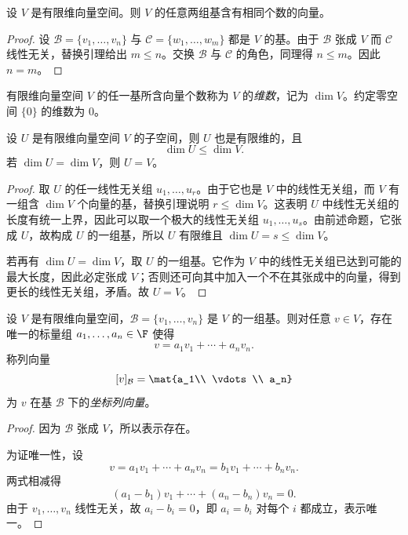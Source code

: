\begin{theorem}[维数的良定义]
设 $V$ 是有限维向量空间。则 $V$ 的任意两组基含有相同个数的向量。
\end{theorem}

\begin{proof}
设 $\mathcal B=\{v_1,\dots,v_n\}$ 与 $\mathcal C=\{w_1,\dots,w_m\}$ 都是 $V$ 的基。由于 $\mathcal B$ 张成 $V$ 而 $\mathcal C$ 线性无关，替换引理给出 $m\le n$。交换 $\mathcal B$ 与 $\mathcal C$ 的角色，同理得 $n\le m$。因此 $n=m$。
\end{proof}

\begin{definition}
有限维向量空间 $V$ 的任一基所含向量个数称为 $V$ 的\emph{维数}，记为 $\dim V$。约定零空间 $\{0\}$ 的维数为 $0$。
\end{definition}

\begin{proposition}
设 $U$ 是有限维向量空间 $V$ 的子空间，则 $U$ 也是有限维的，且
\[
\dim U\le \dim V.
\]
若 $\dim U=\dim V$，则 $U=V$。
\end{proposition}

\begin{proof}
取 $U$ 的任一线性无关组 $u_1,\dots,u_r$。由于它也是 $V$ 中的线性无关组，而 $V$ 有一组含 $\dim V$ 个向量的基，替换引理说明 $r\le \dim V$。这表明 $U$ 中线性无关组的长度有统一上界，因此可以取一个极大的线性无关组 $u_1,\dots,u_s$。由前述命题，它张成 $U$，故构成 $U$ 的一组基，所以 $U$ 有限维且 $\dim U=s\le \dim V$。

若再有 $\dim U=\dim V$，取 $U$ 的一组基。它作为 $V$ 中的线性无关组已达到可能的最大长度，因此必定张成 $V$；否则还可向其中加入一个不在其张成中的向量，得到更长的线性无关组，矛盾。故 $U=V$。
\end{proof}

\begin{proposition}[坐标的存在唯一性]
设 $V$ 是有限维向量空间，$\mathcal B=\{v_1,\dots,v_n\}$ 是 $V$ 的一组基。则对任意 $v\in V$，存在唯一的标量组 $a_1,\dots,a_n\in\F$ 使得
\[
v=a_1v_1+\cdots+a_nv_n.
\]
称列向量
\[
[v]_{\mathcal B}=\mat{a_1\\ \vdots \\ a_n}
\]
为 $v$ 在基 $\mathcal B$ 下的\emph{坐标列向量}。
\end{proposition}

\begin{proof}
因为 $\mathcal B$ 张成 $V$，所以表示存在。

为证唯一性，设
\[
v=a_1v_1+\cdots+a_nv_n=b_1v_1+\cdots+b_nv_n.
\]
两式相减得
\[
(a_1-b_1)v_1+\cdots+(a_n-b_n)v_n=0.
\]
由于 $v_1,\dots,v_n$ 线性无关，故 $a_i-b_i=0$，即 $a_i=b_i$ 对每个 $i$ 都成立，表示唯一。
\end{proof}

